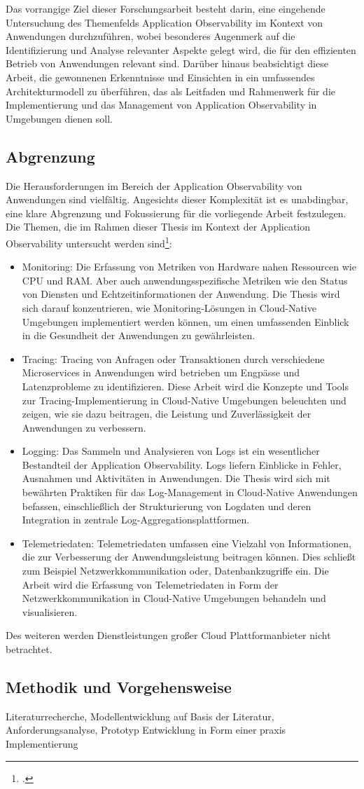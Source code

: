 Das vorrangige Ziel dieser Forschungsarbeit besteht darin, eine eingehende Untersuchung des Themenfelds Application Observability im Kontext von \cn Anwendungen durchzuführen, wobei besonderes Augenmerk auf die Identifizierung und Analyse relevanter Aspekte gelegt wird, die für den effizienten Betrieb von Anwendungen relevant sind. Darüber hinaus beabsichtigt diese Arbeit, die gewonnenen Erkenntnisse und Einsichten in ein umfassendes Architekturmodell zu überführen, das als Leitfaden und Rahmenwerk für die Implementierung und das Management von Application Observability in \cn Umgebungen dienen soll.

\subsection{Abgrenzung}
Die Herausforderungen im Bereich der Application Observability von \cn Anwendungen sind vielfältig. Angesichts dieser Komplexität ist es unabdingbar, eine klare Abgrenzung und Fokussierung für die vorliegende Arbeit festzulegen. Die Themen, die im Rahmen dieser Thesis im Kontext der Application Observability untersucht werden sind\footcite[Vgl.][S.5]{Pourmajidi2023}:
\begin{itemize}
	\item Monitoring: Die Erfassung von Metriken von Hardware nahen Ressourcen wie CPU und RAM. Aber auch anwendungsspezifische Metriken wie den Status von Diensten und Echtzeitinformationen der Anwendung. Die Thesis wird sich darauf konzentrieren, wie Monitoring-Lösungen in Cloud-Native Umgebungen implementiert werden können, um einen umfassenden Einblick in die Gesundheit der Anwendungen zu gewährleisten.
	\item Tracing: Tracing von Anfragen oder Transaktionen durch verschiedene Microservices in \cn Anwendungen wird betrieben um Engpässe und Latenzprobleme zu identifizieren. Diese Arbeit wird die Konzepte und Tools zur Tracing-Implementierung in Cloud-Native Umgebungen beleuchten und zeigen, wie sie dazu beitragen, die Leistung und Zuverlässigkeit der Anwendungen zu verbessern.
	\item Logging: Das Sammeln und Analysieren von Logs ist ein wesentlicher Bestandteil der Application Observability. Logs liefern Einblicke in Fehler, Ausnahmen und Aktivitäten in Anwendungen. Die Thesis wird sich mit bewährten Praktiken für das Log-Management in Cloud-Native Anwendungen befassen, einschließlich der Strukturierung von Logdaten und deren Integration in zentrale Log-Aggregationsplattformen.
	\item Telemetriedaten: Telemetriedaten umfassen eine Vielzahl von Informationen, die zur Verbesserung der Anwendungsleistung beitragen können. Dies schließt zum Beispiel Netzwerkkommunikation oder, Datenbankzugriffe ein. Die Arbeit wird die Erfassung von Telemetriedaten in Form der Netzwerkkommunikation in Cloud-Native Umgebungen behandeln und visualisieren.
\end{itemize}

Des weiteren werden Dienstleistungen großer Cloud Plattformanbieter nicht betrachtet.

\subsection{Methodik und Vorgehensweise}
Literaturrecherche, Modellentwicklung auf Basis der Literatur, Anforderungsanalyse, Prototyp Entwicklung in Form einer praxis Implementierung